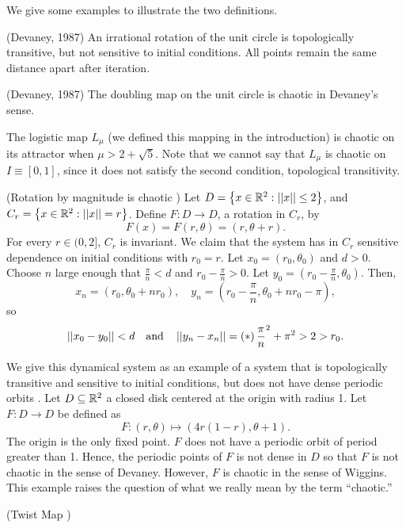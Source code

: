 \documentclass[12pt,draft,twoside]{book}
\begin{document}
We give some examples to illustrate the two definitions.
  \begin{example}
    (Devaney, 1987)
    An irrational rotation of the unit circle is topologically transitive, but not sensitive to initial conditions.
    All points remain the same distance apart after iteration.
  \end{example}
  \begin{example}
    (Devaney, 1987)
    The doubling map on the unit circle is chaotic in Devaney's sense.
  \end{example}
  \begin{example}
    The logistic map $L_\mu$ (we defined this mapping in the introduction) is chaotic on its attractor when $\mu > 2 + \sqrt{5}$.
    Note that we cannot say that $L_\mu$ is chaotic on $I \equiv [0,1]$, since it does not satisfy the second condition, topological transitivity.
  \end{example}
  \begin{example}
    (Rotation by magnitude is chaotic \citep{martelli})
    Let $D = \left \{ x \in \mathbb{R}^2: \left|\left| x \right|\right| \leq 2 \right \}$, and $C_r = \left \{ x \in \mathbb{R}^2: \left|\left| x \right|\right| = r \right \}$.
    Define $F: D \to D$, a rotation in $C_r$, by
    \begin{equation*}
      F(x) = F(r, \theta) = (r, \theta + r).
    \end{equation*}
    For every $r \in (0,2]$, $C_r$ is invariant.
    We claim that the system has in $C_r$ sensitive dependence on initial conditions with $r_0 = r$.
    Let $x_0 = (r_0, \theta_0)$ and $d > 0$.
    Choose $n$ large enough that $\frac{\pi}{n} < d$ and $r_0 - \frac{\pi}{n} > 0$.
    Let $y_0 = (r_0 - \frac{\pi}{n}, \theta_0)$.
    Then,
    \begin{equation*}
      x_n = (r_0, \theta_0 + nr_0),\quad
      y_n = (r_0 - \frac{\pi}{n}, \theta_0 + nr_0 - \pi),
    \end{equation*}
    so
    \begin{equation*}
      \left|\left| x_0 - y_0 \right|\right| < d \quad\mbox{and}\quad \left|\left| y_n - x_n \right|\right| = \left ( * \right ){\frac{\pi}{n}}^2 + \pi^2 > 2 > r_0.
    \end{equation*}
  \end{example}
  \begin{example}
    We give this dynamical system as an example of a system that is topologically transitive and sensitive to initial conditions, but does not have dense periodic orbits \citep{martelli}.
    Let $D \subseteq \mathbb{R}^2$ a closed disk centered at the origin with radius 1.
    Let $F: D \to D$ be defined as
    \begin{equation*}
      F: (r, \theta) \mapsto (4r(1 - r), \theta + 1).
    \end{equation*}
    The origin is the only fixed point.
    $F$ does not have a periodic orbit of period greater than 1.
    Hence, the periodic points of $F$ is not dense in $D$ so that $F$ is not chaotic in the sense of Devaney.
    However, $F$ is chaotic in the sense of Wiggins.
    This example raises the question of what we really mean by the term ``chaotic.''
  \end{example}
  \begin{example}
    (Twist Map \citep{wiggins})
  \end{example}
\end{document}
